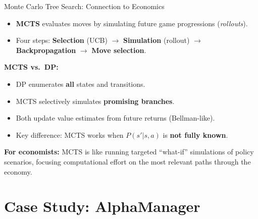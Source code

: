 \documentclass[10pt,english,aspectratio=169]{beamer}
\begin{document}
\begin{frame}{Monte Carlo Tree Search: Connection to Economics}
\begin{itemize}
    \item \textbf{MCTS} evaluates moves by simulating future game progressions (\emph{rollouts}).
    \item Four steps: \textbf{Selection} (UCB) $\to$ \textbf{Simulation} (rollout) $\to$ \textbf{Backpropagation} $\to$ \textbf{Move selection}.
\end{itemize}

\vspace{0.3cm}
\textbf{MCTS vs.\ DP:}
\begin{itemize}
    \item DP enumerates \textbf{all} states and transitions.
    \item MCTS selectively simulates \textbf{promising branches}.
    \item Both update value estimates from future returns (Bellman-like).
    \item Key difference: MCTS works when $P(s'|s,a)$ is \textbf{not fully known}.
\end{itemize}

\vspace{0.3cm}
\textbf{For economists:} MCTS is like running targeted ``what-if'' simulations of policy scenarios, focusing computational effort on the most relevant paths through the economy.
\end{frame}


\section{Case Study: AlphaManager}
\end{document}
